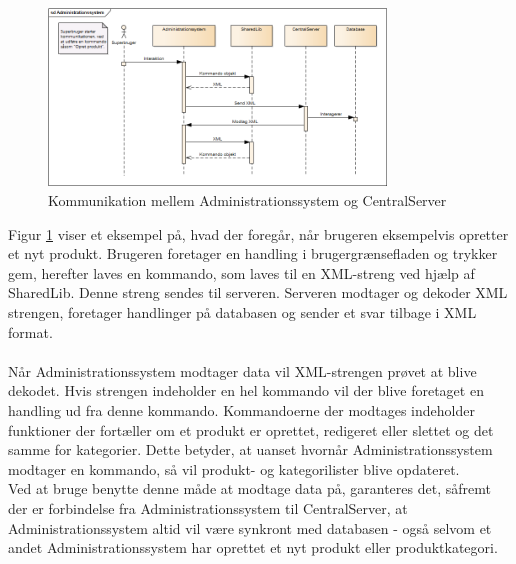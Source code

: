 \begin{figure}[H]
	\centering
	\includegraphics[width=0.8\textwidth]{Projektbeskrivelse/DesignOgImplementering/Images/Administrationssystem-sekvensdiagram}
	\caption{Kommunikation mellem Administrationssystem og CentralServer}
	\label{fig:adminsekvens}
\end{figure}

Figur \ref{fig:adminsekvens} viser et eksempel på, hvad der foregår, når brugeren eksempelvis opretter et nyt produkt. Brugeren foretager en handling i brugergrænsefladen og trykker gem, herefter laves en kommando, som laves til en XML-streng ved hjælp af SharedLib. Denne streng sendes til serveren. Serveren modtager og dekoder XML strengen, foretager handlinger på databasen og sender et svar tilbage i XML format.\\\\
Når Administrationssystem modtager data vil XML-strengen prøvet at blive dekodet. Hvis strengen indeholder en hel kommando vil der blive foretaget en handling ud fra denne kommando. Kommandoerne der modtages indeholder funktioner der fortæller om et produkt er oprettet, redigeret eller slettet og det samme for kategorier. Dette betyder, at uanset hvornår Administrationssystem modtager en kommando, så vil produkt- og kategorilister blive opdateret.\\
Ved at bruge benytte denne måde at modtage data på, garanteres det, såfremt der er forbindelse fra Administrationssystem til CentralServer, at Administrationssystem altid vil være synkront med databasen - også selvom et andet Administrationssystem har oprettet et nyt produkt eller produktkategori.

